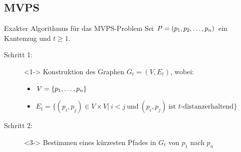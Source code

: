 \documentclass{beamer}
\begin{document}
	\subsection{MVPS}
	\begin{frame}{Exakter Algorithmus für das MVPS-Problem}
		Sei $P = (p_1, p_2, \mathellipsis, p_n)$ ein Kantenzug und $t \geq 1$.
		\begin{description}
			\item[Schritt 1:]<1-> Konstruktion des Graphen $G_t = (V, E_t)$, wobei:
			\begin{itemize}
				\setlength{\itemindent}{-1.3cm}
				\item $V = \{p_1, \mathellipsis, p_n\}$
				\item $E_t = \{(p_i, p_j) \in V\times V|\ i < j\ \text{und}\ (p_i,p_j)\ \text{ist $t$-distanzerhaltend}\}$
			\end{itemize}
			\item[Schritt 2:]<3-> Bestimmen eines kürzesten Pfades in $G_t$ von $p_1$ nach $p_n$
		\end{description}
	\end{frame}
	
\end{document}
